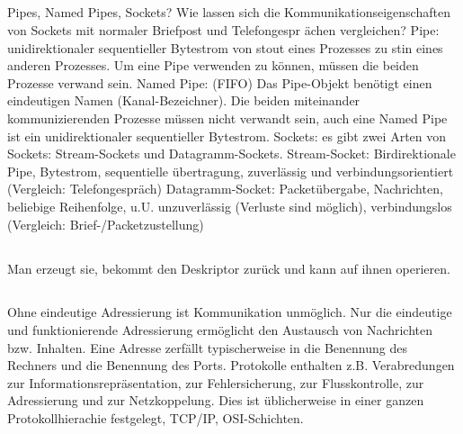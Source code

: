 \subsection{}
\begin{answer}
Pipes, Named Pipes, Sockets?
Wie lassen sich die Kommunikationseigenschaften von Sockets mit normaler Briefpost und Telefongespr
ächen vergleichen?
Pipe: unidirektionaler sequentieller Bytestrom von stout eines Prozesses zu stin eines anderen
Prozesses. Um eine Pipe verwenden zu können, müssen die beiden Prozesse verwand sein.
Named Pipe: (FIFO) Das Pipe-Objekt benötigt einen eindeutigen Namen (Kanal-Bezeichner). Die
beiden miteinander kommunizierenden Prozesse müssen nicht verwandt sein, auch eine Named Pipe
ist ein unidirektionaler sequentieller Bytestrom.
Sockets: es gibt zwei Arten von Sockets: Stream-Sockets und Datagramm-Sockets.
Stream-Socket: Birdirektionale Pipe, Bytestrom, sequentielle übertragung, zuverlässig und verbindungsorientiert
(Vergleich: Telefongespräch)
Datagramm-Socket: Packetübergabe, Nachrichten, beliebige Reihenfolge, u.U. unzuverlässig (Verluste
sind möglich), verbindungslos (Vergleich: Brief-/Packetzustellung)
\end{answer}

\subsection{}
\begin{answer}
Man erzeugt sie, bekommt den Deskriptor zurück und kann auf ihnen operieren.
\end{answer}

\subsection{}
\begin{answer}
Ohne eindeutige Adressierung ist Kommunikation unmöglich. Nur die eindeutige und funktionierende
Adressierung ermöglicht den Austausch von Nachrichten bzw. Inhalten.
Eine Adresse zerfällt typischerweise in die Benennung des Rechners und die Benennung des Ports.
Protokolle enthalten z.B. Verabredungen zur Informationsrepräsentation, zur Fehlersicherung, zur
Flusskontrolle, zur Adressierung und zur Netzkoppelung. Dies ist üblicherweise in einer ganzen
Protokollhierachie festgelegt, TCP/IP, OSI-Schichten.
\end{answer}


